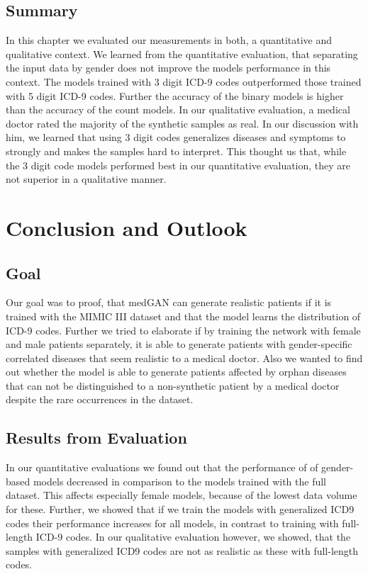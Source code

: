 \documentclass[11pt, a4paper, oneside]{book}
\begin{document}
\section{Summary}
In this chapter we evaluated our measurements in both, a quantitative and qualitative context. We learned from the quantitative evaluation, that separating the input data by gender does not improve the models performance in this context. The models trained with 3 digit ICD-9 codes outperformed those trained with 5 digit ICD-9 codes. Further the accuracy of the binary models is higher than the accuracy of the count models.
In our qualitative evaluation, a medical doctor rated the majority of the synthetic samples as real. In our discussion with him, we learned that using 3 digit codes generalizes diseases and symptoms to strongly and makes the samples hard to interpret.
This thought us that, while the 3 digit code models performed best in our quantitative evaluation, they are not superior in a qualitative manner.

\chapter{Conclusion and Outlook}
\section{Goal}
Our goal was to proof, that medGAN can generate realistic patients if it is trained with the MIMIC III dataset and that the model learns the distribution of ICD-9 codes. Further we tried to elaborate if by training the network with female and male patients separately, it is able to generate patients with gender-specific correlated diseases that seem realistic to a medical doctor. Also we wanted to find out whether the model is able to generate patients affected by orphan diseases that can not be distinguished to a non-synthetic patient by a medical doctor despite the rare occurrences in the dataset.
\section{Results from Evaluation}
In our quantitative evaluations we found out that the performance of of gender-based models decreased in comparison to the models trained with the full dataset. This affects especially female models, because of the lowest data volume for these. Further, we showed  that if we train the models with generalized ICD9 codes their performance increases for all models, in contrast to training with full-length ICD-9 codes.
In our qualitative evaluation however, we showed, that the samples with generalized ICD9 codes are not as realistic as these with full-length codes.
\end{document}
